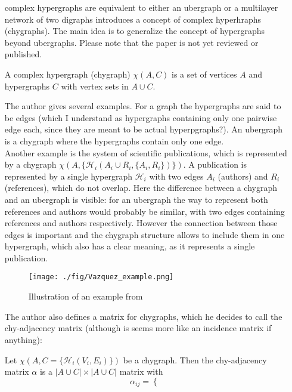 \begin{itemize}
\item [complex hypergraphs are equivalent to either an ubergraph or a multilayer network of two digraphs] \cite{Vazquez2022} introduces a concept of complex hyperhraphs (chygraphs). The main idea is to generalize the concept of hypergraphs beyond ubergraphs. Please note that the paper is not yet reviewed or published.
\begin{definition}
    A complex hypergraph (chygraph) $\chi(A,C)$ is a set of vertices $A$ and hypergraphs $C$ with vertex sets in $A \cup C$.
\end{definition}
The author gives several examples. For a graph the hypergraphs are said to be edges (which I understand as hypergraphs containing only one pairwise edge each, since they are meant to be actual hyperpgraphs?).
An ubergraph is a chygraph where the hypergraphs contain only one edge. \\
Another example is the system of scientific publications, which is represented by a chygraph $\chi(A, \{ \mathcal{H}_i(A_i \cup R_i, \{A_i, R_i\})\}) $. A publication is represented by a single hypergraph $\mathcal{H}_i$ with two edges $A_i$ (authors) and $R_i$ (references), which do not overlap. Here the difference between a chygraph and an ubergraph is visible: for an ubergraph the way to represent both references and authors would probably be similar, with two edges containing references and authors respectively. However the connection between those edges is important and the chygraph structure allows to include them in one hypergraph, which also has a clear meaning, as it represents a single publication. \\
\begin{figure}[h!]
	\begin{center}
        \texttt{[image: ./fig/Vazquez\_example.png]}
        \caption{Illustration of an example from \cite{Vazquez2022}} 
    	\label{Vazquez_example}
    \end{center}
    \end{figure}
The author also defines a matrix for chygraphs, which he decides to call the chy-adjacency matrix (although is seems more like an incidence matrix if anything):
\begin{definition}
    Let $\chi(A, C=\{ \mathcal{H}_i(V_i, E_i)\})$ be a chygraph. Then the chy-adjacency matrix $\alpha$ is a  $|A\cup C| \times |A \cup C|$ matrix with 
    \begin{equation*}
        \alpha_{ij}=\begin{cases}

\end{cases}
\end{equation*}
\end{definition}
\end{itemize}
